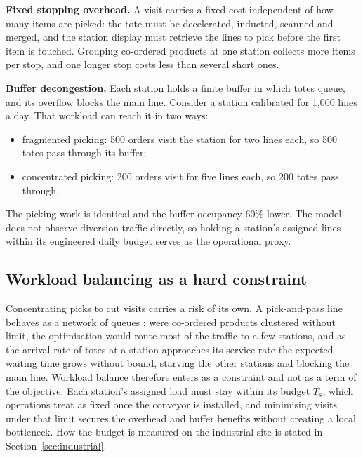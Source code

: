\documentclass[]{interact}
\begin{document}
\textbf{Fixed stopping overhead.} A visit carries a fixed cost independent of how many items are picked: the tote must be decelerated, inducted, scanned and merged, and the station display must retrieve the lines to pick before the first item is touched. Grouping co-ordered products at one station collects more items per stop, and one longer stop costs less than several short ones.

\textbf{Buffer decongestion.} Each station holds a finite buffer in which totes queue, and its overflow blocks the main line. Consider a station calibrated for 1,000 lines a day. That workload can reach it in two ways:
\begin{itemize}
\item fragmented picking: 500 orders visit the station for two lines each, so 500 totes pass through its buffer;
\item concentrated picking: 200 orders visit for five lines each, so 200 totes pass through.
\end{itemize}
The picking work is identical and the buffer occupancy 60\% lower. The model does not observe diversion traffic directly, so holding a station's assigned lines within its engineered daily budget serves as the operational proxy.

\subsection{Workload balancing as a hard constraint}\label{sec:workload}
Concentrating picks to cut visits carries a risk of its own. A pick-and-pass line behaves as a network of queues \citep{kim2020, tarczynski2023}: were co-ordered products clustered without limit, the optimisation would route most of the traffic to a few stations, and as the arrival rate of totes at a station approaches its service rate the expected waiting time grows without bound, starving the other stations and blocking the main line. Workload balance therefore enters as a constraint and not as a term of the objective. Each station's assigned load must stay within its budget $T_s$, which operations treat as fixed once the conveyor is installed, and minimising visits under that limit secures the overhead and buffer benefits without creating a local bottleneck. How the budget is measured on the industrial site is stated in Section~\ref{sec:industrial}.
\end{document}
